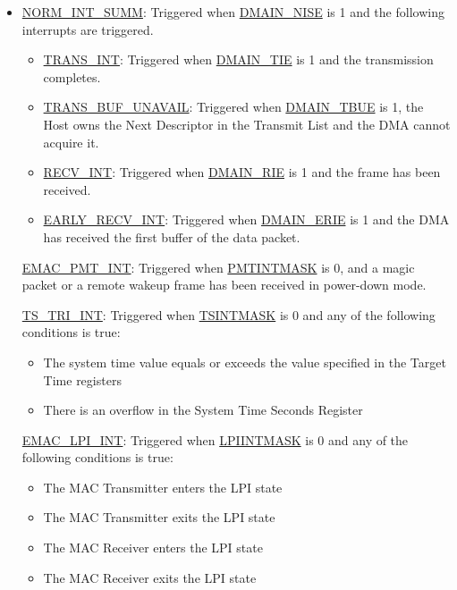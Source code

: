 \documentclass[main\_\_EN.tex]{subfiles}
\begin{document}
\begin{itemize}
\item \hyperref[regdesc:DMASTATUSREG]{NORM\_INT\_SUMM}: Triggered when \hyperref[regdesc:DMAINENREG]{DMAIN\_NISE} is 1 and the following interrupts are triggered.
    \begin{itemize}
    \item \hyperref[regdesc:DMASTATUSREG]{TRANS\_INT}: Triggered when \hyperref[regdesc:DMAINENREG]{DMAIN\_TIE} is 1 and the transmission completes.
    \item \hyperref[regdesc:DMASTATUSREG]{TRANS\_BUF\_UNAVAIL}: Triggered when \hyperref[regdesc:DMAINENREG]{DMAIN\_TBUE} is 1, the Host owns the Next Descriptor in the Transmit List and the DMA cannot acquire it.
    \item \hyperref[regdesc:DMASTATUSREG]{RECV\_INT}: Triggered when \hyperref[regdesc:DMAINENREG]{DMAIN\_RIE} is 1 and the frame has been received.
    \item \hyperref[regdesc:DMASTATUSREG]{EARLY\_RECV\_INT}: Triggered when \hyperref[regdesc:DMAINENREG]{DMAIN\_ERIE} is 1 and the DMA has received the first buffer of the data packet.
    \end{itemize}

\hyperref[regdesc:DMASTATUSREG]{EMAC\_PMT\_INT}: Triggered when \hyperref[regdesc:EMACINTMASKREG]{PMTINTMASK} is 0, and a magic packet or a remote wakeup frame has been received in power-down mode.

\hyperref[regdesc:DMASTATUSREG]{TS\_TRI\_INT}: Triggered when \hyperref[regdesc:EMACINTMASKREG]{TSINTMASK} is 0 and any of the following conditions is true:
\begin{itemize}
\item  The system time value equals or exceeds the value specified in the Target Time registers
\item There is an overflow in the System Time Seconds Register
\end{itemize}

\hyperref[regdesc:DMASTATUSREG]{EMAC\_LPI\_INT}: Triggered when \hyperref[regdesc:EMACINTMASKREG]{LPIINTMASK} is 0 and  any of the following conditions is true:
\begin{itemize}
\item The MAC Transmitter enters the LPI state
\item The MAC Transmitter exits the LPI state
\item The MAC Receiver enters the LPI state
\item The MAC Receiver exits the LPI state
\end{itemize}
\end{itemize}
\end{document}
